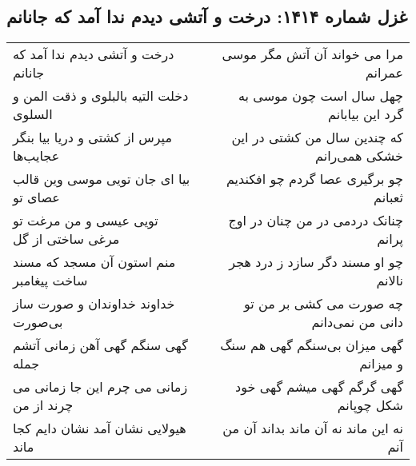 \begin{center}
\section*{غزل شماره ۱۴۱۴: درخت و آتشی دیدم ندا آمد که جانانم}
\label{sec:1414}
\begin{longtable}{l p{0.5cm} r}
درخت و آتشی دیدم ندا آمد که جانانم
&&
مرا می خواند آن آتش مگر موسی عمرانم
\\
دخلت التیه بالبلوی و ذقت المن و السلوی
&&
چهل سال است چون موسی به گرد این بیابانم
\\
مپرس از کشتی و دریا بیا بنگر عجایب‌ها
&&
که چندین سال من کشتی در این خشکی همی‌رانم
\\
بیا ای جان تویی موسی وین قالب عصای تو
&&
چو برگیری عصا گردم چو افکندیم ثعبانم
\\
تویی عیسی و من مرغت تو مرغی ساختی از گل
&&
چنانک دردمی در من چنان در اوج پرانم
\\
منم استون آن مسجد که مسند ساخت پیغامبر
&&
چو او مسند دگر سازد ز درد هجر نالانم
\\
خداوند خداوندان و صورت ساز بی‌صورت
&&
چه صورت می کشی بر من تو دانی من نمی‌دانم
\\
گهی سنگم گهی آهن زمانی آتشم جمله
&&
گهی میزان بی‌سنگم گهی هم سنگ و میزانم
\\
زمانی می چرم این جا زمانی می چرند از من
&&
گهی گرگم گهی میشم گهی خود شکل چوپانم
\\
هیولایی نشان آمد نشان دایم کجا ماند
&&
نه این ماند نه آن ماند بداند آن من آنم
\\
\end{longtable}
\end{center}
